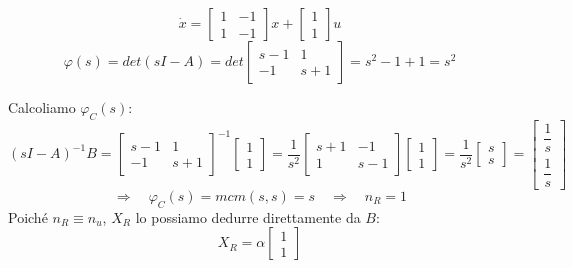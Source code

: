 \documentclass[../main.tex]{subfiles}
\begin{document}
		\begin{Exercise}[title={Calcolare $ X_R $ e $ \varphi_C(s) $}, difficulty=1]
			\[
				\dot x =
				\begin{bmatrix}
					1 & -1\\
					1 & -1
				\end{bmatrix} x+
				\begin{bmatrix}
					1\\
					1
				\end{bmatrix} u
			\]
			\[
				\varphi(s) = det(sI-A) = det
				\begin{bmatrix}
					s-1 & 1\\
					-1 & s+1
				\end{bmatrix} =
				s^2 - 1 + 1 = s^2
			\]
			
			Calcoliamo $ \varphi_C(s) $:
			\[
				(sI-A)^{-1}B =
				\begin{bmatrix}
					s-1 & 1\\
					-1 & s+1
				\end{bmatrix}^{-1}
				\begin{bmatrix}
					1\\
					1
				\end{bmatrix} = \dfrac{1}{s^2}
				\begin{bmatrix}
					s+1 & -1\\
					1 & s-1
				\end{bmatrix}
				\begin{bmatrix}
					1\\
					1
				\end{bmatrix}= \dfrac{1}{s^2}
				\begin{bmatrix}
					s\\
					s
				\end{bmatrix} =
				\begin{bmatrix}
					\dfrac{1}{s}\\[.5cm]
					\dfrac{1}{s}
				\end{bmatrix}
			\]
			\[ \Rightarrow\quad \varphi_C(s) = mcm\left( s, s \right) = s \quad\Rightarrow\quad n_R = 1 \]
			Poich\'e $ n_R \equiv n_u $, $ X_R $ lo possiamo dedurre direttamente da $ B $:
			\[
				X_R = \alpha
				\begin{bmatrix}
					1\\
					1
				\end{bmatrix}
			\]
		\end{Exercise}
	
\end{document}

